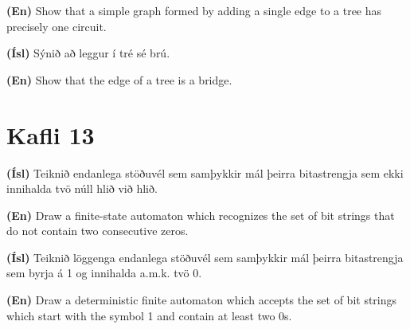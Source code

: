 \documentclass[addpoints]{exam}
\begin{document}
\begin{questions}
\textbf{(En)} Show that a simple graph formed by adding a single edge to a tree has precisely one circuit.

\question[10]
\textbf{(Ísl)} Sýnið að leggur í tré sé brú.

\textbf{(En)} Show that the edge of a tree is a bridge.

\section{Kafli 13}

\question[10] \textbf{(Ísl)} Teiknið endanlega stöðuvél sem samþykkir mál þeirra bitastrengja sem ekki innihalda tvö núll hlið við hlið.

\textbf{(En)} Draw a finite-state automaton which recognizes the set of bit strings that do not contain two consecutive zeros.

\question[10]

\textbf{(Ísl)} Teiknið löggenga endanlega stöðuvél sem samþykkir mál þeirra bitastrengja sem byrja á 1 og innihalda a.m.k. tvö 0.

\textbf{(En)} Draw a deterministic finite automaton which accepts the set of bit strings which start with the symbol 1 and contain at least two 0s.

\end{questions}
\end{document}
